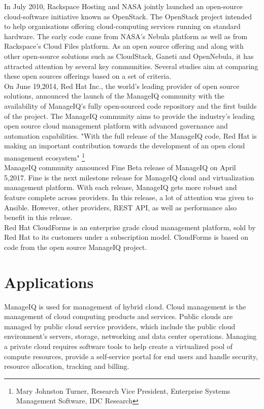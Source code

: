 \documentclass[a4paper,12pt]{report}
\begin{document}
In July 2010, Rackspace Hosting and NASA jointly launched an open-source cloud-software initiative known as OpenStack. The OpenStack project intended to help organisations offering cloud-computing services running on standard hardware. The early code came from NASA's Nebula platform as well as from Rackspace's Cloud Files platform. As an open source offering and along with other open-source solutions such as CloudStack, Ganeti and OpenNebula, it has attracted attention by several key communities. Several studies aim at comparing these open sources offerings based on a set of criteria.\\

On June 19,2014, Red Hat Inc., the world’s leading provider of open source solutions, announced the launch of the ManageIQ community with the availability of ManageIQ’s fully open-sourced code repository and the first builds of the project. The ManageIQ community aims to provide the industry's leading open source cloud management platform with advanced governance and automation capabilities.
"With the full release of the ManageIQ code, Red Hat is making an important contribution towards the development of an open cloud management ecosystem"
\footnote{Mary Johnston Turner, Research Vice President, Enterprise Systems Management Software, IDC Research}\\

ManageIQ community announced Fine Beta release of ManageIQ on April 5,2017. Fine is the next milestone release for ManageIQ cloud and virtualization management platform. With each release, ManageIQ gets more robust and feature complete across providers. In this release, a lot of attention was given to Ansible. However, other providers, REST API, as well as performance also benefit in this release.\\

Red Hat CloudForms is an enterprise grade cloud management platform, sold by Red Hat to its customers under a subscription model. CloudForms is based on code from the open source ManageIQ project.

\chapter{Applications}
ManageIQ is used for management of hybrid cloud. Cloud management is the management of cloud computing products and services. Public clouds are managed by public cloud service providers, which include the public cloud environment’s servers, storage, networking and data center operations. Managing a private cloud requires software tools to help create a virtualized pool of compute resources, provide a self-service portal for end users and handle security, resource allocation, tracking and billing.\\
\end{document}

